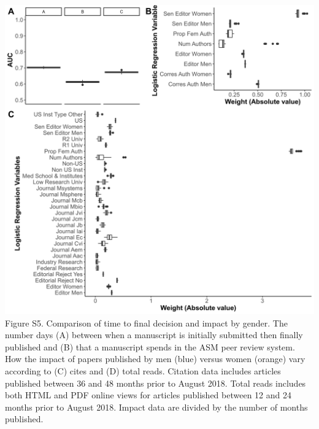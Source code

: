 \documentclass[11pt,]{article}
\begin{document}
\newpage

\includegraphics{Figure_S5.png} Figure S5. Comparison of time to final
decision and impact by gender. The number days (A) between when a
manuscript is initially submitted then finally published and (B) that a
manuscript spends in the ASM peer review system. How the impact of
papers published by men (blue) versus women (orange) vary according to
(C) cites and (D) total reads. Citation data includes articles published
between 36 and 48 months prior to August 2018. Total reads includes both
HTML and PDF online views for articles published between 12 and 24
months prior to August 2018. Impact data are divided by the number of
months published.

\newpage
\end{document}
